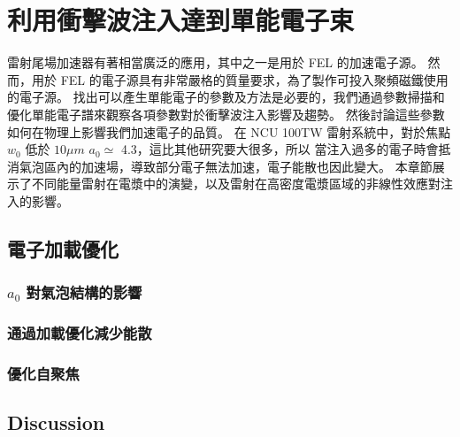 
\chapter{利用衝擊波注入達到單能電子束}%

雷射尾場加速器有著相當廣泛的應用，其中之一是用於 FEL 的加速電子源。 然而，用於 FEL 的電子源具有非常嚴格的質量要求，為了製作可投入聚頻磁鐵使用的電子源。 找出可以產生單能電子的參數及方法是必要的，我們通過參數掃描和優化單能電子譜來觀察各項參數對於衝擊波注入影響及趨勢。 然後討論這些參數如何在物理上影響我們加速電子的品質。
在 NCU 100TW 雷射系統中，對於焦點 \(w_{0}\) 低於 \(10\mu m\) \(a_{0} \simeq \) 4.3，這比其他研究要大很多，所以 \cite{Rechatin_2010} 當注入過多的電子時會抵消氣泡區內的加速場，導致部分電子無法加速，電子能散也因此變大。 本章節展示了不同能量雷射在電漿中的演變，以及雷射在高密度電漿區域的非線性效應對注入的影響。
\section{電子加載優化}%

\subsection{\(a_{0}\) 對氣泡結構的影響}%

\subsection{通過加載優化減少能散}

\subsection{優化自聚焦}%


\section{Discussion}
